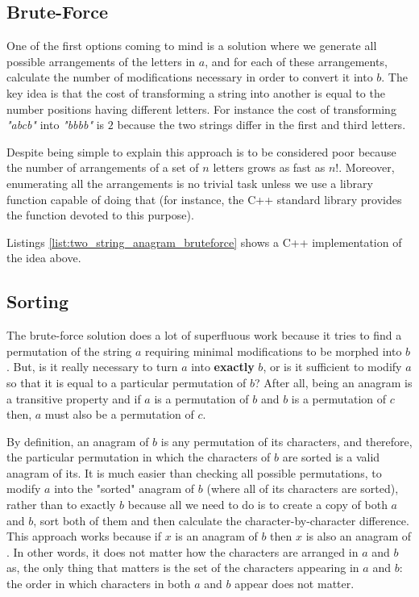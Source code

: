 \subsection{Brute-Force}
\label{sec:anagrams:bruteforce}


One of the first options coming to mind is a solution where we generate all possible arrangements of the letters in $a$, and
for each of these arrangements, calculate the number of modifications necessary in order to convert it into $b$. 
The key idea is that the cost of transforming a string into
another is equal to the number positions having different letters. 
For instance the cost of transforming \textit{"abcb"}
into \textit{"bbbb"} is $2$ because the two strings differ in the first and third letters. 

Despite being simple to explain this approach is to be considered poor because the number
of arrangements of a set of $n$ letters grows as fast as $n!$.
Moreover, enumerating all the arrangements is no trivial task unless we use a  library function capable of doing that (for instance, the C++ standard library provides the function \href{https://en.cppreference.com/w/cpp/algorithm/next_permutation}{} devoted to this purpose).

Listings \ref{list:two_string_anagram_bruteforce} shows a C++ implementation of the idea above.




\subsection{Sorting}
\label{sec:anagrams:sorting}

The brute-force solution does a lot of superfluous work because it tries to find a permutation of the string $a$
requiring minimal modifications to be morphed into $b$.
But, is it really necessary to turn $a$ into \textbf{exactly} $b$, or is it sufficient to modify $a$ so that it is equal to a particular permutation of $b$? 
After all, being an anagram is a transitive property and if $a$ is a permutation of $b$ and $b$ is a permutation of $c$ then, $a$ must also be a permutation of $c$. 

By definition, an anagram of $b$ is any permutation of its characters, and therefore, the particular permutation in which the characters of $b$ are sorted is a valid anagram of its. 
It is much easier than checking all possible permutations, to modify $a$ into the "sorted" anagram of $b$ (where all of its characters are sorted), rather than to exactly $b$ because all we need to do is to create a copy of both $a$ and $b$, sort both of them and then calculate the character-by-character difference.
\textit{}This approach works because if $x$ is an anagram of $b$ then $x$ is also an
anagram of \textit{}. In other words, it does not matter how the characters are arranged in $a$ and $b$ as, the only thing that matters is the set of the characters
appearing in $a$ and $b$: the order in which characters in both $a$ and $b$ appear does not matter. 

